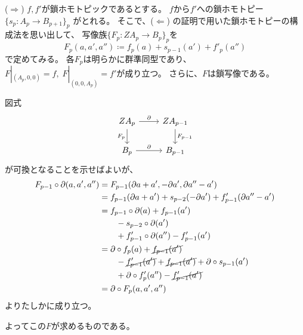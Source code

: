 \documentclass[report]{jlreq}
\begin{document}
\begin{answer}
    ($\Rightarrow$) \quad
    $f, f'$が鎖ホモトピックであるとする。
    $f$から$f'$への鎖ホモトピー$\{ s_p \colon A_{p} \to B_{p + 1} \}_{p}$
    がとれる。
    そこで、($\Leftarrow$) の証明で用いた鎖ホモトピーの構成法を思い出して、
    写像族$\{ F_p \colon ZA_p \to B_p \}_p$を
    \begin{equation}
        F_p (a, a', a'') \coloneqq
            f_p(a) + s_{p - 1}(a') + f'_p(a'')
    \end{equation}
    で定めてみる。
    各$F_p$は明らかに群準同型であり、
    $F|_{(A_p, 0, 0)} = f, \; F|_{(0, 0, A_p)} = f'$が成り立つ。
    さらに、$F$は鎖写像である。
    \begin{innerproof}
        図式
        \begin{equation}
            \begin{tikzcd}
                ZA_p \ar{d}[swap]{F_p} \ar{r}{\del}
                    & ZA_{p - 1} \ar{d}{F_{p - 1}} \\
                B_p \ar{r}{\del}
                    & B_{p - 1}
            \end{tikzcd}
        \end{equation}
        が可換となることを示せばよいが、
        \begin{alignat}{1}
            F_{p - 1} \circ \partial (a, a', a'')
                &= F_{p - 1} (\partial a + a', - \partial a', \partial a'' - a') \\
                &= f_{p - 1} (\partial a + a')
                    + s_{p - 2} (- \partial a')
                    + f'_{p - 1} (\partial a'' - a') \\
                &= f_{p - 1} \circ \partial (a) + f_{p - 1} (a') \\
                &\qquad - s_{p - 2} \circ \partial (a') \\
                &\qquad + f'_{p - 1} \circ \partial (a'') - f'_{p - 1} (a') \\
                &= \partial \circ f_{p} (a)
                    + \cancel{f_{p - 1} (a')} \\
                &\qquad - \cancel{f'_{p - 1} (a')}
                    + \cancel{f_{p - 1} (a')}
                    + \partial \circ s_{p - 1} (a') \\
                &\qquad + \partial \circ f'_{p} (a'')
                    - \cancel{f'_{p - 1} (a')} \\
                &= \partial \circ F_p (a, a', a'')
        \end{alignat}
        よりたしかに成り立つ。
    \end{innerproof}
    よってこの$F$が求めるものである。
\end{answer}
\end{document}
